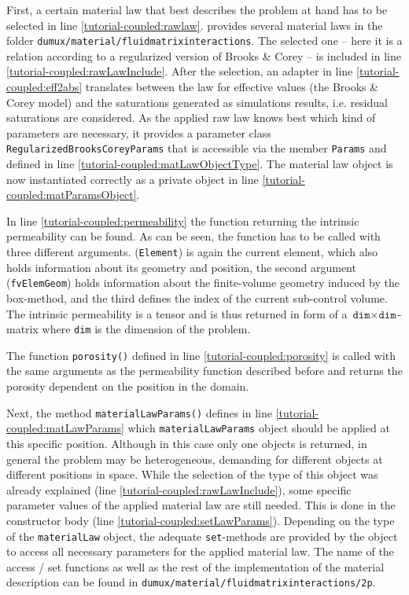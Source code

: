 First, a certain material law that best describes the problem at hand has to
be selected in line \ref{tutorial-coupled:rawlaw}\label{tutorial-coupled:materialLaw}. 
\Dumux provides several material laws in the folder 
\verb+dumux/material/fluidmatrixinteractions+.
The selected one -- here it is a relation according to a regularized version of Brooks \& Corey --  is included
in line \ref{tutorial-coupled:rawLawInclude}. After the selection,
an adapter in line \ref{tutorial-coupled:eff2abs} translates between the law
for effective values (the Brooks \& Corey model) and the saturations generated as simulations results, i.e. residual saturations are considered. 
As the applied raw law knows best which kind of parameters are necessary,
it provides a parameter class \texttt{RegularizedBrooksCoreyParams} that is
accessible via the member \texttt{Params} and defined in line 
\ref{tutorial-coupled:matLawObjectType}. The material law object 
is now instantiated correctly as a private object
in line \ref{tutorial-coupled:matParamsObject}.

In line \ref{tutorial-coupled:permeability} the function returning the
intrinsic permeability can be found. As can be seen, the function has
to be called with three different arguments. 
(\texttt{Element}) is again the current element, which also holds information
about its geometry and position, the second argument
(\texttt{fvElemGeom}) holds information about the finite-volume geometry induced
by the box-method, and the third defines the index of the current sub-control 
volume. The intrinsic permeability is a tensor and is thus returned in form of
a $\texttt{dim} \times \texttt{dim}$-matrix where \texttt{dim} is the dimension 
of the problem. 

The function \texttt{porosity()} defined in line
\ref{tutorial-coupled:porosity} is called with the same arguments as
the permeability function described before and returns the porosity
dependent on the position in the domain.

Next, the method \texttt{materialLawParams()} defines in line 
\ref{tutorial-coupled:matLawParams} which \verb+materialLawParams+ object 
 should be applied at this specific position. Although in this case only one objects is returned, 
in general the problem may be heterogeneous, demanding for different objects at different positions in space. 
While the selection of the type of this object was already explained (line \ref{tutorial-coupled:rawLawInclude}),
 some specific parameter 
values of the applied material law are still needed. This is 
done in the constructor body (line \ref{tutorial-coupled:setLawParams}).
Depending on the type of the \texttt{materialLaw} object, the adequate \texttt{set}-methods
are provided by the object to access all necessary parameters 
for the applied material law. The name of the access / set functions as well as the rest of the implementation 
of the material description can be found in 
\verb+dumux/material/fluidmatrixinteractions/2p+.

